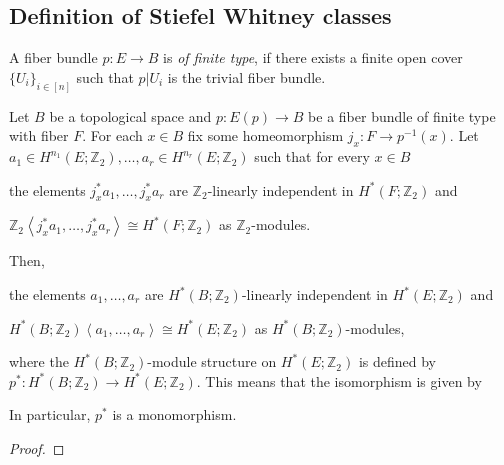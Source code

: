 \subsection{Definition of Stiefel Whitney classes}
\begin{definition} A fiber bundle $p:E\to B$ is \emph{of finite type}, if there exists a finite open cover $\{U_i\}_{i\in[n]}$ such that $p|U_i$ is the trivial fiber bundle.
\end{definition}
\begin{theorem}\label{thm:leray_hirsch} Let $B$ be a topological space and $p:E(p)\to B$ be a fiber bundle of finite type with fiber $F$. For each $x\in B$ fix some homeomorphism $j_x:F\to p^{-1}(x)$. Let $a_1\in H^{n_1}(E;\mathbb{Z}_2),\ldots,a_r\in H^{n_r}(E;\mathbb{Z}_2)$ such that for every $x\in B$
\begin{b_item}
\item the elements $j_x^*a_1,\ldots,j_x^*a_r$ are $\mathbb{Z}_2$-linearly independent in $H^*(F;\mathbb{Z}_2)$ and
\item $\mathbb{Z}_2\left<j_x^*a_1,\ldots,j_x^*a_r\right>\cong H^*(F;\mathbb{Z}_2)$ as $\mathbb{Z}_2$-modules.
\end{b_item}
Then,
\begin{b_item}
\item the elements $a_1,\ldots,a_r$ are $H^*(B;\mathbb{Z}_2)$-linearly independent in $H^*(E;\mathbb{Z}_2)$ and
\item $H^*(B;\mathbb{Z}_2)\left<a_1,\ldots,a_r\right>\cong H^*(E;\mathbb{Z}_2)$ as $H^*(B;\mathbb{Z}_2)$-modules,
\end{b_item}
where the $H^*(B;\mathbb{Z}_2)$-module structure on $H^*(E;\mathbb{Z}_2)$ is defined by $p^*:H^*(B;\mathbb{Z}_2)\to H^*(E;\mathbb{Z}_2)$. This means that the isomorphism is given by
\begin{center}
\end{center}
In particular, $p^*$ is a monomorphism.
\end{theorem}
\begin{proof}
\end{proof}

